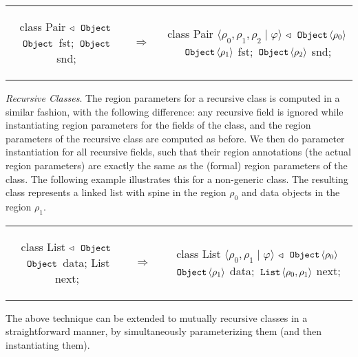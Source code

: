 \begin{tabular}{ccc}
\begin{minipage}{0.33\linewidth}
\begin{codejava}
class Pair $\triangleleft$ $\,{\tt Object}\,$ {
  $\,{\tt Object}\,$ fst;
  $\,{\tt Object}\,$ snd;
}
\end{codejava}
\end{minipage}
&
$\Rightarrow \; \;$
&
\begin{minipage}{0.6\linewidth}
\begin{codejava}
class Pair $\langle \rho_0, \rho_1, \rho_2 \; | \; \varphi \rangle$ $\triangleleft$ $\,{\tt Object}\, \langle \rho_0 \rangle$ {
  $\,{\tt Object}\, \langle \rho_1 \rangle$ fst;
  $\,{\tt Object}\, \langle \rho_2 \rangle$ snd;
}
\end{codejava}
\end{minipage}
\end{tabular}

\emph{Recursive Classes}.
The region parameters for a recursive class is computed in
a similar fashion, with the following difference: any recursive
field is ignored while instantiating region parameters for the fields of
the class, and the region parameters of the recursive class are computed
as before. We then do parameter instantiation for all recursive fields,
such that their region annotations (the actual region parameters) are
exactly the same as the (formal) region parameters of the class.
The following example illustrates this for a non-generic  class.
The resulting class represents a linked list with spine in the region
$\rho_0$ and data objects in the region $\rho_1$.

\begin{tabular}{ccc}
\begin{minipage}{0.33\linewidth}
\begin{codejava}
class List $\triangleleft$ $\,{\tt Object}\,$ {
  $\,{\tt Object}\,$ data;
  List next;
}
\end{codejava}
\end{minipage}
&
$\Rightarrow \; \;$
&
\begin{minipage}{0.65\linewidth}
\begin{codejava}
class List $\langle \rho_0, \rho_1 \; | \; \varphi \rangle$ $\triangleleft$ $\,{\tt Object}\, \langle \rho_0 \rangle$ {
  $\,{\tt Object}\, \langle \rho_1 \rangle$ data;
  $\,{\tt List}\, \langle \rho_0, \rho_1 \rangle$ next;
}
\end{codejava}
\end{minipage}
\end{tabular}

The above technique can be extended to mutually recursive classes in a
straightforward manner, by simultaneously parameterizing them (and
then instantiating them).

